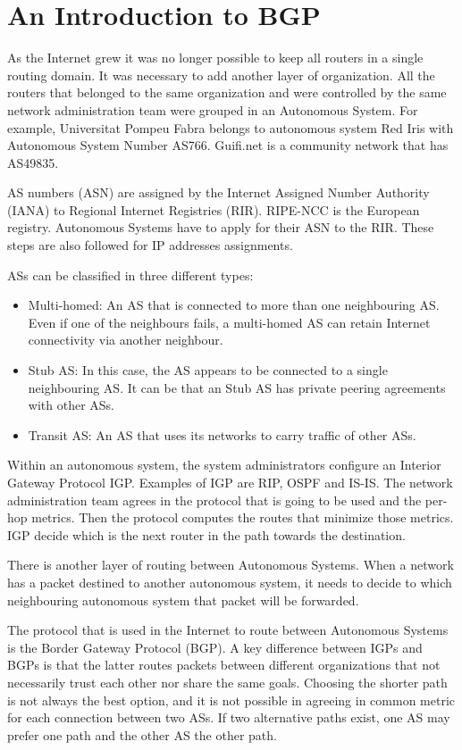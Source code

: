 \chapter{An Introduction to BGP}

As the Internet grew it was no longer possible to keep all routers in a single routing domain.
It was necessary to add another layer of organization.
All the routers that belonged to the same organization and were controlled by the same network administration team were grouped in an Autonomous System.
For example, Universitat Pompeu Fabra belongs to autonomous system Red Iris with Autonomous System Number AS766.
Guifi.net is a community network that has AS49835.

AS numbers (ASN) are assigned by the Internet Assigned Number Authority (IANA) to Regional Internet Registries (RIR).
RIPE-NCC is the European registry.
Autonomous Systems have to apply for their ASN to the RIR.
These steps are also followed for IP addresses assignments.

ASs can be classified in three different types:
\begin{itemize}
\item Multi-homed: An AS that is connected to more than one neighbouring AS. 
Even if one of the neighbours fails, a multi-homed AS can retain Internet connectivity via another neighbour.
\item Stub AS: In this case, the AS appears to be connected to a single neighbouring AS. 
It can be that an Stub AS has private peering agreements with other ASs.
\item Transit AS: An AS that uses its networks to carry traffic of other ASs.
\end{itemize}

Within an autonomous system, the system administrators configure an Interior Gateway Protocol IGP.
Examples of IGP are RIP, OSPF and IS-IS.
The network administration team agrees in the protocol that is going to be used and the per-hop metrics.
Then the protocol computes the routes that minimize those metrics.
IGP decide which is the next router in the path towards the destination.


There is another layer of routing between Autonomous Systems.
When a network has a packet destined to another autonomous system, it needs to decide to which neighbouring autonomous system that packet will be forwarded.


The protocol that is used in the Internet to route between Autonomous Systems is the Border Gateway Protocol (BGP).
A key difference between IGPs and BGPs is that the latter routes packets between different organizations that not necessarily trust each other nor share the same goals.
Choosing the shorter path is not always the best option, and it is not possible in agreeing in common metric for each connection between two ASs.
If two alternative paths exist, one AS may prefer one path and the other AS the other path.

